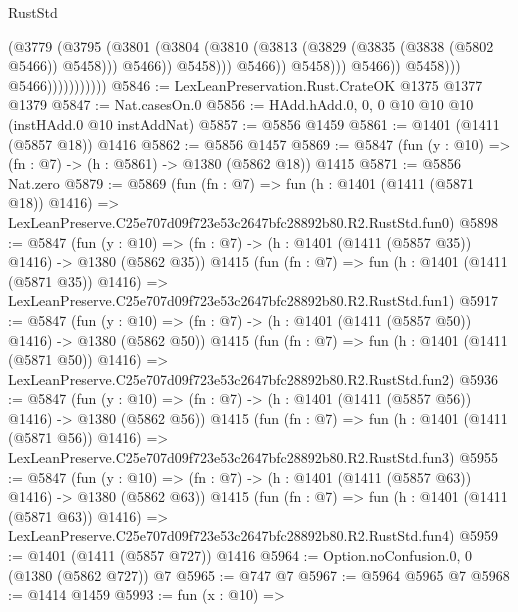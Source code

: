 \begin{lexlean}{RustStd}
\begin{coremodule}
                                              (@3779
                                                (@3795
                                                  (@3801
                                                    (@3804
                                                      (@3810
                                                        (@3813
                                                          (@3829
                                                            (@3835 (@3838 (@5802 @5466)) @5458)))
                                                        @5466))
                                                    @5458)))
                                              @5466))
                                          @5458)))
                                    @5466))
                                @5458)))
                          @5466)))))))))))
@5846 := LexLeanPreservation.Rust.CrateOK @1375 @1377 @1379
@5847 := Nat.casesOn.{0}
@5856 := HAdd.hAdd.{0, 0, 0} @10 @10 @10 (instHAdd.{0} @10 instAddNat)
@5857 := @5856 @1459
@5861 := @1401 (@1411 (@5857 @18)) @1416
@5862 := @5856 @1457
@5869 := @5847 (fun (y : @10) => (fn : @7) -> (h : @5861) -> @1380 (@5862 @18)) @1415
@5871 := @5856 Nat.zero
@5879 := @5869
    (fun (fn : @7) =>
    fun (h : @1401 (@1411 (@5871 @18)) @1416) =>
    LexLeanPreserve.C25e707d09f723e53c2647bfc28892b80.R2.RustStd.fun0)
@5898 := @5847
    (fun (y : @10) => (fn : @7) -> (h : @1401 (@1411 (@5857 @35)) @1416) -> @1380 (@5862 @35))
    @1415
    (fun (fn : @7) =>
    fun (h : @1401 (@1411 (@5871 @35)) @1416) =>
    LexLeanPreserve.C25e707d09f723e53c2647bfc28892b80.R2.RustStd.fun1)
@5917 := @5847
    (fun (y : @10) => (fn : @7) -> (h : @1401 (@1411 (@5857 @50)) @1416) -> @1380 (@5862 @50))
    @1415
    (fun (fn : @7) =>
    fun (h : @1401 (@1411 (@5871 @50)) @1416) =>
    LexLeanPreserve.C25e707d09f723e53c2647bfc28892b80.R2.RustStd.fun2)
@5936 := @5847
    (fun (y : @10) => (fn : @7) -> (h : @1401 (@1411 (@5857 @56)) @1416) -> @1380 (@5862 @56))
    @1415
    (fun (fn : @7) =>
    fun (h : @1401 (@1411 (@5871 @56)) @1416) =>
    LexLeanPreserve.C25e707d09f723e53c2647bfc28892b80.R2.RustStd.fun3)
@5955 := @5847
    (fun (y : @10) => (fn : @7) -> (h : @1401 (@1411 (@5857 @63)) @1416) -> @1380 (@5862 @63))
    @1415
    (fun (fn : @7) =>
    fun (h : @1401 (@1411 (@5871 @63)) @1416) =>
    LexLeanPreserve.C25e707d09f723e53c2647bfc28892b80.R2.RustStd.fun4)
@5959 := @1401 (@1411 (@5857 @727)) @1416
@5964 := Option.noConfusion.{0, 0} (@1380 (@5862 @727)) @7
@5965 := @747 @7
@5967 := @5964 @5965 @7
@5968 := @1414 @1459
@5993 := fun (x : @10) =>

\end{coremodule}
\end{lexlean}
